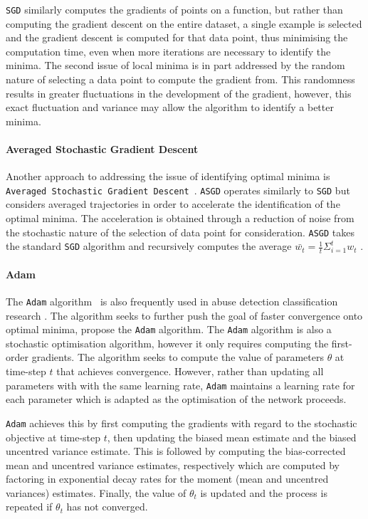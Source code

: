\texttt{SGD} similarly computes the gradients of points on a function, but rather than computing the gradient descent on the entire dataset, a single example is selected and the gradient descent is computed for that data point, thus minimising the computation time, even when more iterations are necessary to identify the minima. 
The second issue of local minima is in part addressed by the random nature of selecting a data point to compute the gradient from. 
This randomness results in greater fluctuations in the development of the gradient, however, this exact fluctuation and variance may allow the algorithm to identify a better minima.

\paragraph{Averaged Stochastic Gradient Descent}
Another approach to addressing the issue of identifying optimal minima is \texttt{Averaged Stochastic Gradient Descent}~\citet{Polyak:1992}. 
\texttt{ASGD} operates similarly to \texttt{SGD} but considers averaged trajectories in order to accelerate the identification of the optimal minima. 
The acceleration is obtained through a reduction of noise from the stochastic nature of the selection of data point for consideration. 
\texttt{ASGD} takes the standard \texttt{SGD} algorithm and recursively computes the average $\bar{w_t} = \tfrac{1}{t}\Sigma_{i=1}^t w_t$ \citep{Bottou:2010}.

\paragraph{Adam}
The \texttt{Adam} algorithm~\citep{Kingma:2015} is also frequently used in abuse detection classification research \citep{Meyer:2019,Zimmerman:2018,Kolhatkar:2020}.
The algorithm seeks to further push the goal of faster convergence onto optimal minima, \citet{Kingma:2015} propose the \texttt{Adam} algorithm.
The \texttt{Adam} algorithm is also a stochastic optimisation algorithm, however it only requires computing the first-order gradients.
The algorithm seeks to compute the value of parameters $\theta$ at time-step $t$ that achieves convergence.
However, rather than updating all parameters with with the same learning rate, \texttt{Adam} maintains a learning rate for each parameter which is adapted as the optimisation of the network proceeds.

\texttt{Adam} achieves this by first computing the gradients with regard to the stochastic objective at time-step $t$, then updating the biased mean estimate and the biased uncentred variance estimate.
This is followed by computing the bias-corrected mean and uncentred variance estimates, respectively which are computed by factoring in exponential decay rates for the moment (mean and uncentred variances) estimates.
Finally, the value of $\theta_t$ is updated and the process is repeated if $\theta_t$ has not converged.


